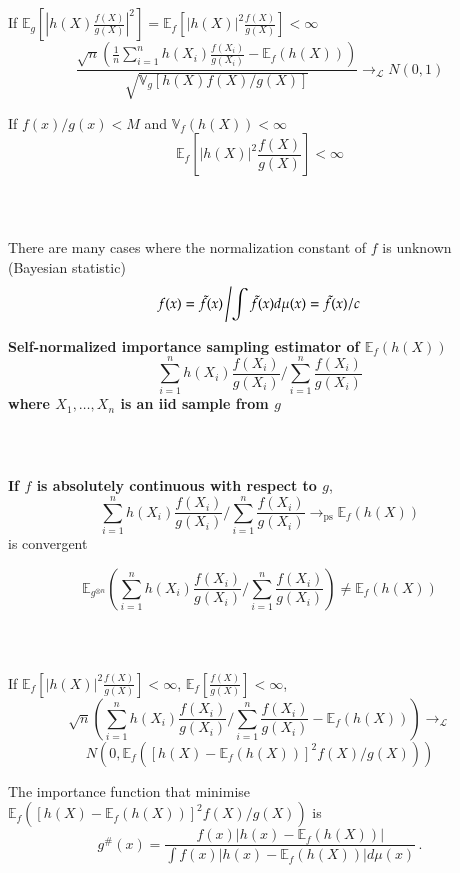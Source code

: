 \documentclass[notes,professionalfont,11pt,usenames,dvipsnames]{beamer}
\renewcommand{\mathcal}{\mathscr}
\newcommand{\ds}{\displaystyle}
\renewcommand{\mathcal}{\mathscr}
\newcommand{\E}{\mathbb{E}}
\newcommand{\V}{\mathbb{V}}
\newcommand\justify{\rightskip0pt \leftskip0pt}
\newenvironment{slide}
{\begin{frame}[environment=slide]
\frametitle{\insertsection \\ \insertsubsection}\justify\setlength{\parskip}{0.5cm}\vspace{-0.5cm}}
{\end{frame}}
\begin{document}
\begin{slide}

If $\E_g\left[\left|h(X)\frac{f(X)}{g(X)}\right|^2\right]=\E_f\left[\left|h(X)\right|^2\frac{f(X)}{g(X)}\right]<\infty$$$
\frac{\sqrt{n}\left(\frac{1}{n}\sum_{i=1}^n h(X_i)\frac{f(X_i)}{g(X_i)}-\E_f(h(X))\right)}{\sqrt{\V_g\left[h(X)f(X)\big/g(X)\right]}}
\longrightarrow_{\mathcal{L}} N(0,1)
$$


If $f(x)/g(x)<M$ and $\V_f(h(X))<\infty$
$$
\E_f\left[\left|h(X)\right|^2\frac{f(X)}{g(X)}\right]<\infty
$$

\end{slide}

\begin{slide}

There are many cases where the normalization constant of $f$ is unknown (Bayesian statistic)
$$
f(x)=\tilde f(x)\left/\int \tilde f(x) d\mu(x)=\tilde f(x)/c\right.
$$


{\bf Self-normalized importance sampling estimator of $\E_f(h(X))$ 
$$
\sum_{i=1}^n h(X_i)\frac{f(X_i)}{g(X_i)}\bigg/ \sum_{i=1}^n \frac{f(X_i)}{g(X_i)}
$$
where $X_1,\ldots,X_n$ is an iid sample from $g$}

\end{slide}

\begin{slide}

\textbf{If $f$ is absolutely continuous with respect to $g$},
$$
\sum_{i=1}^n h(X_i)\frac{f(X_i)}{g(X_i)}\bigg/\sum_{i=1}^n \frac{f(X_i)}{g(X_i)}\longrightarrow_{\mbox{ps}} \E_f(h(X))
$$
is convergent
 

$$
\E_{g^{\otimes n}}\left(\sum_{i=1}^n h(X_i)\frac{f(X_i)}{g(X_i)}\bigg/ \sum_{i=1}^n \frac{f(X_i)}{g(X_i)}\right)\neq \E_f(h(X))
$$

\end{slide}

\begin{slide}

If $\E_f\left[\left|h(X)\right|^2\frac{f(X)}{g(X)}\right]<\infty$, $\E_f\left[\frac{f(X)}{g(X)}\right]<\infty$,
$$
\sqrt{n}\left(\sum_{i=1}^n h(X_i)\frac{f(X_i)}{g(X_i)}\bigg/ \sum_{i=1}^n \frac{f(X_i)}{g(X_i)}-\E_f(h(X))\right)
\longrightarrow_{\mathcal{L}} 
$$
$$
N\left(0,\E_f\left([h(X)-\E_f(h(X))]^2 f(X)\big/g(X)\right)\right)
$$


The importance function that minimise \\
$\ds \E_f\left([h(X)-\E_f(h(X))]^2 f(X)\big/g(X)\right)$ 
is
$$
g^\#(x)=\frac{f(x)|h(x)-\E_f(h(X))|}{\int f(x)|h(x)-\E_f(h(X))|d\mu(x)}\,.
$$

\end{slide}
\end{document}
